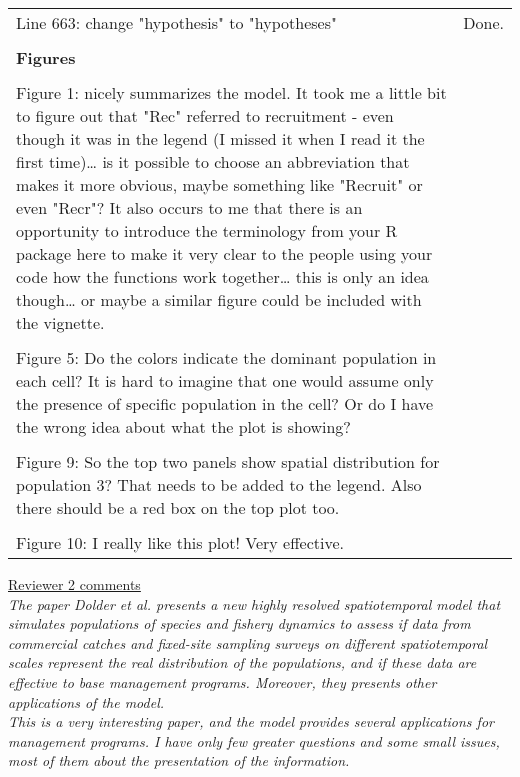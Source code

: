\documentclass{article}
\begin{document}
\begin{landscape}
\begin{center}
\begin{longtable}{p{12cm} | p{12cm}}
\\
Line 663: change "hypothesis" to "hypotheses" & Done. \\
\\
		\hline
		\textbf{Figures} &  \\
\\
Figure 1: nicely summarizes the model. It took me a little bit to figure out
that "Rec" referred to recruitment - even though it was in the legend (I missed
it when I read it the first time)… is it possible to choose an abbreviation
that makes it more obvious, maybe something like "Recruit" or  even "Recr"? It
also occurs to me that there is an opportunity to introduce the terminology
from your R package here to make it very clear to the people using your code
how the functions work together… this is only an idea though… or maybe a
similar figure could be included with the vignette. & \\
\\
Figure 5: Do the colors indicate the dominant population in each cell? It is
hard to imagine that one would assume only the presence of specific population
in the cell? Or do I have the wrong idea about what the plot is showing? & \\
\\
Figure 9: So the top two panels show spatial distribution for population 3?
That needs to be added to the legend. Also there should be a red box on the top
plot too. & \\
\\
Figure 10: I really like this plot! Very effective. & \\
		\bottomrule
	\end{longtable}

\end{center}

\underline{Reviewer 2 comments} \\

\textit{The paper Dolder et al. presents a new highly resolved spatiotemporal
	model that simulates populations of species and fishery dynamics to
	assess if data from commercial catches and fixed-site sampling surveys
	on different spatiotemporal scales represent the real distribution of
	the populations, and if these data are effective to base  management
	programs. Moreover, they presents other applications of the model.} \\

\textit{This is a very interesting paper, and the model provides several
	applications for management programs. I have only few greater questions
	and some small issues, most of them about the presentation of the
	information.}  \\


\end{landscape}
\end{document}
